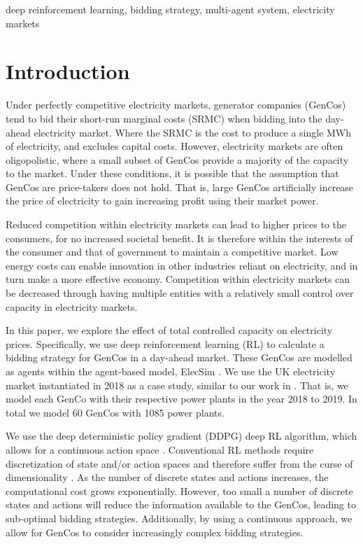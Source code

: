 \documentclass[conference]{IEEEtran}
\begin{document}
\begin{IEEEkeywords}
deep reinforcement learning, bidding strategy, multi-agent system, electricity markets
\end{IEEEkeywords}

\section{Introduction}
\label{sec:introduction}

Under perfectly competitive electricity markets, generator companies (GenCos) tend to bid their short-run marginal costs (SRMC) when bidding into the day-ahead electricity market. Where the SRMC is the cost to produce a single MWh of electricity, and excludes capital costs. However, electricity markets are often oligopolistic, where a small subset of GenCos provide a majority of the capacity to the market. Under these conditions, it is possible that the assumption that GenCos are price-takers does not hold. That is, large GenCos artificially increase the price of electricity to gain increasing profit using their market power. 

Reduced competition within electricity markets can lead to higher prices to the consumers, for no increased societal benefit. It is therefore within the interests of the consumer and that of government to maintain a competitive market. Low energy costs can enable innovation in other industries reliant on electricity, and in turn make a more effective economy. Competition within electricity markets can be decreased through having multiple entities with a relatively small control over capacity in electricity markets. 

In this paper, we explore the effect of total controlled capacity on electricity prices. Specifically, we use deep reinforcement learning (RL) to calculate a bidding strategy for GenCos in a day-ahead market. These GenCos are modelled as agents within the agent-based model, ElecSim \cite{Kell, Kell2020}. We use the UK electricity market instantiated in 2018 as a case study, similar to our work in \cite{Kell2019a}. That is, we model each GenCo with their respective power plants in the year 2018 to 2019. In total we model 60 GenCos with 1085 power plants.

We use the deep deterministic policy gradient (DDPG) deep RL algorithm, which allows for a continuous action space \cite{Hunt2016}. Conventional RL methods require discretization of state and/or action spaces and therefore suffer from the curse of dimensionality \cite{Ye2020a}. As the number of discrete states and actions increases, the computational cost grows exponentially. However, too small a number of discrete states and actions will reduce the information available to the GenCos, leading to sub-optimal bidding strategies. Additionally, by using a continuous approach, we allow for GenCos to consider increasingly complex bidding strategies. 
\end{document}
